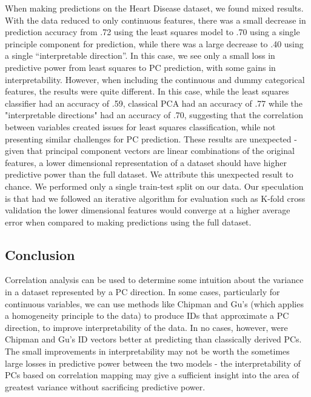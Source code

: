 \documentclass{article}
\begin{document}
{{When making predictions on the Heart Disease dataset, we found mixed results. With the data reduced to only continuous features, there was a small decrease in prediction accuracy from .72 using the least squares model to .70 using a single principle component for prediction, while there was a large decrease to .40 using a single “interpretable direction”. In this case, we see only a small loss in predictive power from least squares to PC prediction, with some gains in interpretability. However, when including the continuous and dummy categorical features, the results were quite different. In this case, while the least squares classifier had an accuracy of .59, classical PCA had an accuracy of .77 while the "interpretable directions" had an accuracy of .70, suggesting that the correlation between variables created issues for least squares classification, while not presenting similar challenges for PC prediction. These results are unexpected - given that principal component vectors are linear combinations of the original features, a lower dimensional representation of a dataset should have higher predictive power than the full dataset. We attribute this unexpected result to chance. We performed only a single train-test split on our data. Our speculation is that had we followed an iterative algorithm for evaluation such as K-fold cross validation the lower dimensional features would converge at a higher average error when compared to making predictions using the full dataset. 
}

\subsection{Conclusion}{
Correlation analysis can be used to determine some intuition about the variance in a dataset represented by a PC direction. In some cases, particularly for continuous variables, we can use methods like Chipman and Gu’s (which applies a homogeneity principle to the data) to produce IDs that approximate a PC direction, to improve interpretability of the data. In no cases, however, were Chipman and Gu’s ID vectors better at predicting than classically derived PCs. The small improvements in interpretability may not be worth the sometimes large losses in predictive power between the two models - the interpretability of PCs based on correlation mapping may give a sufficient insight into the area of greatest variance without sacrificing predictive power.} 
}
\end{document}
